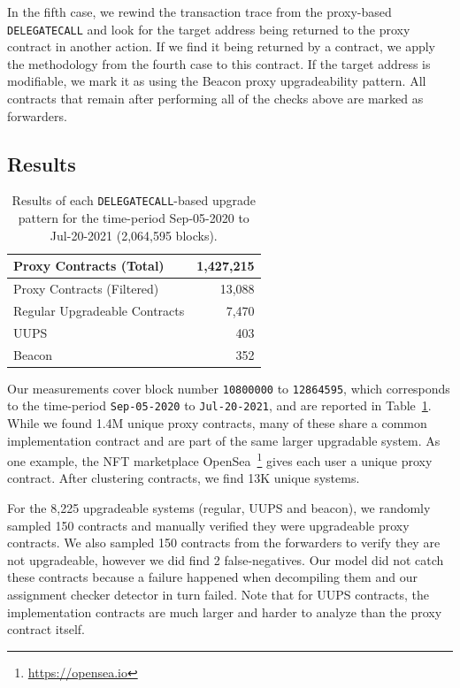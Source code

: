 In the fifth case, we rewind the transaction trace from the proxy-based \texttt{DELEGATECALL} and look for the target address being returned to the proxy contract in another action. If we find it being returned by a contract, we apply the methodology from the fourth case to this contract. If the target address is modifiable, we mark it as using the Beacon proxy upgradeability pattern. All contracts that remain after performing all of the checks above are marked as forwarders. 

\subsection{Results}

\begin{table}[t]
\centering
\begin{tabular}{|l|r|}
\hline
Proxy Contracts (Total) & 1,427,215  \\ \hline 
Proxy Contracts (Filtered) & 13,088  \\ \hline 
Regular Upgradeable Contracts & 7,470  \\ \hline
UUPS & 403  \\ \hline
Beacon & 352  \\ \hline
\end{tabular}
\caption{\label{tab:updata} Results of each \texttt{DELEGATECALL}-based upgrade pattern for the time-period {Sep-05-2020} to {Jul-20-2021} (2,064,595 blocks).}
\vspace{-10pt}
\end{table}

Our measurements cover block number \texttt{10800000} to \texttt{12864595}, which corresponds to the time-period \texttt{Sep-05-2020} to \texttt{Jul-20-2021}, and are reported in Table~\ref{tab:updata}. While we found 1.4M unique proxy contracts, many of these share a common implementation contract and are part of the same larger upgradable system. As one example, the NFT marketplace OpenSea~\footnote{\url{https://opensea.io}} gives each user a unique proxy contract. After clustering contracts, we find 13K unique systems.  

For the 8,225 upgradeable systems (regular, UUPS and beacon), we randomly sampled 150 contracts and manually verified they were upgradeable proxy contracts. We also sampled 150 contracts from the forwarders to verify they are not upgradeable, however we did find 2 false-negatives. Our model did not catch these contracts because a failure happened when decompiling them and our assignment checker detector in turn failed. Note that for UUPS contracts, the implementation contracts are much larger and harder to analyze than the proxy contract itself.

